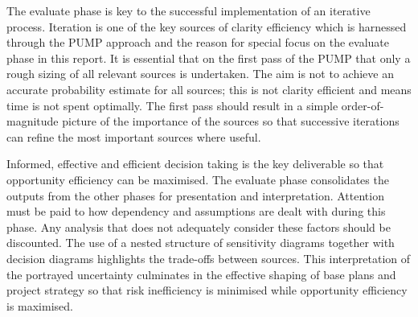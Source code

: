 The evaluate phase is key to the successful implementation of an iterative process.
Iteration is one of the key sources of clarity efficiency which is harnessed through the PUMP approach and the reason for special focus on the evaluate phase in this report.
It is essential that on the first pass of the PUMP that only a rough sizing of all relevant sources is undertaken.
The aim is not to achieve an accurate probability estimate for all sources; this is not clarity efficient and means time is not spent optimally.
The first pass should result in a simple order-of-magnitude picture of the importance of the sources so that successive iterations can refine the most important sources where useful.

Informed, effective and efficient decision taking is the key deliverable so that opportunity efficiency can be maximised.
The evaluate phase consolidates the outputs from the other phases for presentation and interpretation.
Attention must be paid to how dependency and assumptions are dealt with during this phase.
Any analysis that does not adequately consider these factors should be discounted.
The use of a nested structure of sensitivity diagrams together with decision diagrams \citep{chapman} highlights the trade-offs between sources.
This interpretation of the portrayed uncertainty culminates in the effective shaping of base plans and project strategy so that risk inefficiency is minimised while opportunity efficiency is maximised.




